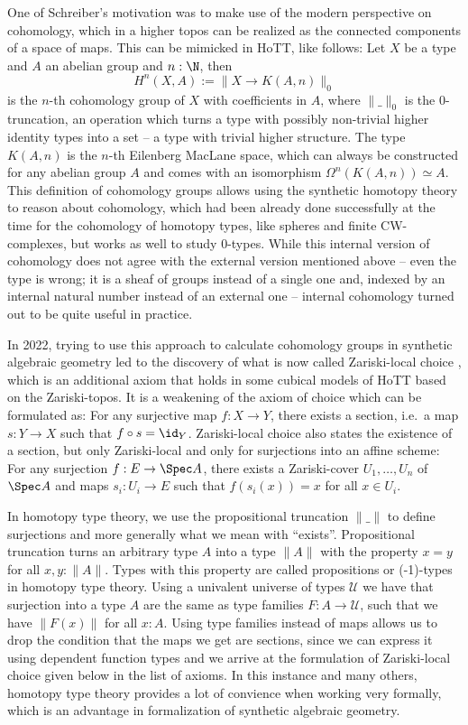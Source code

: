 One of Schreiber's motivation was to make use of the modern perspective on cohomology, which in a higher topos can be realized as the connected components of a space of maps. This can be mimicked in HoTT, like follows: Let $X$ be a type and $A$ an abelian group and $n:\N$, then
\[ H^n(X,A):=\| X\to K(A,n) \|_0\]
is the $n$-th cohomology group of $X$ with coefficients in $A$, where $\|\_\|_0$ is the $0$-truncation, an operation which turns a type with possibly non-trivial higher identity types into a set -- a type with trivial higher structure. The type $K(A,n)$ is the $n$-th Eilenberg MacLane space, which can always be constructed for any abelian group $A$ and comes with an isomorphism $\Omega^n(K(A,n))\simeq A$.
This definition of cohomology groups allows using the synthetic homotopy theory to reason about cohomology, which had been already done successfully at the time for the cohomology of homotopy types, like spheres and finite CW-complexes, but works as well to study $0$-types.
While this internal version of cohomology does not agree with the external version mentioned above --
even the type is wrong; it is a sheaf of groups instead of a single one and, indexed by an internal natural number instead of an external one -- internal cohomology turned out to be quite useful in practice.

In 2022, trying to use this approach to calculate cohomology groups in synthetic algebraic geometry led to the discovery of what is now called Zariski-local choice \cite{draft},
which is an additional axiom that holds in some cubical models of HoTT based on the Zariski-topos.
It is a weakening of the axiom of choice which can be formulated as: For any surjective map $f:X\to Y$, there exists a section, i.e.\ a map $s:Y\to X$ such that $f\circ s=\id_Y$.
Zariski-local choice also states the existence of a section, but only Zariski-local and only for surjections into an affine scheme: For any surjection $f:E\to \Spec A$,
there exists a Zariski-cover $U_1,\dots,U_n$ of $\Spec A$ and maps $s_i:U_i\to E$ such that $f(s_i(x))=x$ for all $x\in U_i$.

In homotopy type theory, we use the propositional truncation $\|\_\|$ to define surjections and more generally what we mean with ``exists''.
Propositional truncation turns an arbitrary type $A$ into a type $\|A\|$ with the property $x=y$ for all $x,y:\|A\|$.
Types with this property are called propositions or (-1)-types in homotopy type theory.
Using a univalent universe of types $\mathcal U$ we have that surjection into a type $A$ are the same as type families $F:A\to \mathcal U$, such that we have $\|F(x)\|$ for all $x: A$.
Using type families instead of maps allows us to drop the condition that the maps we get are sections, since we can express it using dependent function types and we arrive at the formulation of Zariski-local choice given below in the list of axioms.
In this instance and many others, homotopy type theory provides a lot of convience when working very formally, which is an advantage in formalization of synthetic algebraic geometry.

